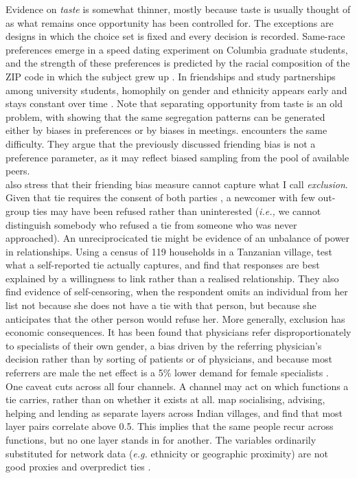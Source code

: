 \noindent Evidence on \textit{taste} is somewhat thinner, mostly because taste is usually thought of as what remains once opportunity has been controlled for. The exceptions are designs in which the choice set is fixed and every decision is recorded. Same-race preferences emerge in a speed dating experiment on Columbia graduate students, and the strength of these preferences is predicted by the racial composition of the ZIP code in which the subject grew up \citep{fisman2008racial}. In friendships and study partnerships among university students, homophily on gender and ethnicity appears early and stays constant over time \citep{jackson2022dynamics}. Note that separating opportunity from taste is an old problem, with \citet{currarini2009economic} showing that the same segregation patterns can be generated either by biases in preferences or by biases in meetings. \citet{chetty2022social} encounters the same difficulty. They argue that the previously discussed friending bias is not a preference parameter, as it may reflect biased sampling from the pool of available peers. \\

\noindent \citet{chetty2022social} also stress that their friending bias measure cannot capture what I call \textit{exclusion}. Given that tie requires the consent of both parties \citep{jackson1996strategic}, a newcomer with few out-group ties may have been refused rather than uninterested (\textit{i.e.,} we cannot distinguish somebody who refused a tie from someone who was never approached). An unreciprocicated tie might be evidence of an unbalance of power in relationships. Using a census of 119 households in a Tanzanian village, \citet{comola2014testing} test what a self-reported tie actually captures, and find that responses are best explained by a willingness to link rather than a realised relationship.  They also find evidence of self-censoring, when the respondent omits an individual from her list not because she does not have a tie with that person, but because she anticipates that the other person would refuse her. More generally, exclusion has economic consequences. It has been found that physicians refer disproportionately to specialists of their own gender, a bias driven by the referring physician's decision rather than by sorting of patients or of physicians, and because most referrers are male the net effect is a 5\% lower demand for female specialists \citep{zeltzer2020gender}. \\

\noindent One caveat cuts across all four channels. A channel may act on which functions a tie carries, rather than on whether it exists at all. \citet{chandrasekhar2025multiplexing} map socialising, advising, helping and lending as separate layers across Indian villages, and find that most layer pairs correlate above 0.5. This implies that the same people recur across functions, but no one layer stands in for another. The variables ordinarily substituted for network data (\textit{e.g.} ethnicity or geographic proximity) are not good proxies and overpredict ties \citep{conley2010learning}. 

